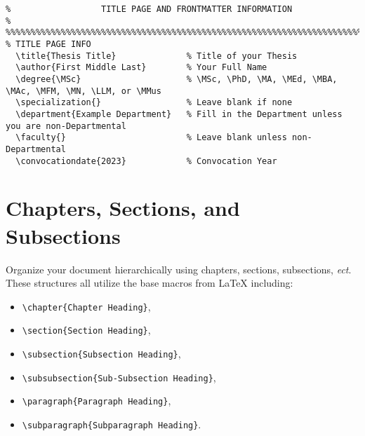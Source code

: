 \begin{lstlisting}[float=h,caption=Example of How to Set Title Page Info,label=lst:TitlePage,style=LaTeXStyle,basicstyle=\scriptsize\ttfamily,]
%%%%%%%%%%%%%%%%%%%%%%%%%%%%%%%%%%%%%%%%%%%%%%%%%%%%%%%%%%%%%%%%%%%%%%%%%%%%%%%%
%                  TITLE PAGE AND FRONTMATTER INFORMATION                      %
%%%%%%%%%%%%%%%%%%%%%%%%%%%%%%%%%%%%%%%%%%%%%%%%%%%%%%%%%%%%%%%%%%%%%%%%%%%%%%%%
% TITLE PAGE INFO
  \title{Thesis Title}              % Title of your Thesis
  \author{First Middle Last}        % Your Full Name
  \degree{\MSc}                     % \MSc, \PhD, \MA, \MEd, \MBA, \MAc, \MFM, \MN, \LLM, or \MMus
  \specialization{}                 % Leave blank if none
  \department{Example Department}   % Fill in the Department unless you are non-Departmental
  \faculty{}                        % Leave blank unless non-Departmental
  \convocationdate{2023}            % Convocation Year
\end{lstlisting}

\section{Chapters, Sections, and Subsections}
Organize your document hierarchically using chapters, sections, subsections, \textit{ect}.
These structures all utilize the base macros from \LaTeX{} including:
	\begin{itemize}
		\item \lstinline|\chapter{Chapter Heading}|, 
		\item \lstinline|\section{Section Heading}|, 
		\item \lstinline|\subsection{Subsection Heading}|, 
		\item \lstinline|\subsubsection{Sub-Subsection Heading}|, 
		\item \lstinline|\paragraph{Paragraph Heading}|, 
		\item \lstinline|\subparagraph{Subparagraph Heading}|. 
	\end{itemize}

